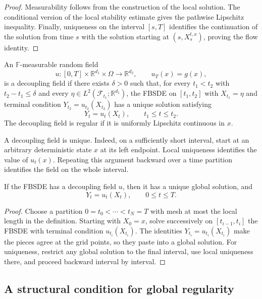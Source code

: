 \begin{proof}
Measurability follows from the construction of the local solution.  The
conditional version of the local stability estimate gives the pathwise
Lipschitz inequality.  Finally, uniqueness on the interval $[s,T]$
identifies the continuation of the solution from time $s$ with the
solution starting at $(s,X_s^{t,x})$, proving the flow identity.
\end{proof}

\begin{de}
An $\mathbb F$-measurable random field
\[
  u:[0,T]\times\mathbb R^{d_1}\times\Omega\longrightarrow\mathbb R^{d_2},
  \qquad u_T(x)=g(x),
\]
is a decoupling field if there exists $\delta>0$ such that, for every
$t_1<t_2$ with $t_2-t_1\le\delta$ and every
$\eta\in L^2(\mathcal F_{t_1};\mathbb R^{d_1})$, the FBSDE on
$[t_1,t_2]$ with $X_{t_1}=\eta$ and terminal condition
$Y_{t_2}=u_{t_2}(X_{t_2})$ has a unique solution satisfying
\[
  Y_t=u_t(X_t),
  \qquad t_1\le t\le t_2.
\]
The decoupling field is regular if it is uniformly Lipschitz continuous
in $x$.
\end{de}

\begin{remark}
A decoupling field is unique.  Indeed, on a sufficiently short interval,
start at an arbitrary deterministic state $x$ at its left endpoint.
Local uniqueness identifies the value of $u_t(x)$.  Repeating this
argument backward over a time partition identifies the field on the
whole interval.
\end{remark}

\begin{thm}
If the FBSDE has a decoupling field $u$, then it has a unique global
solution, and
\[
  Y_t=u_t(X_t),
  \qquad 0\le t\le T.
\]
\end{thm}

\begin{proof}
Choose a partition
$0=t_0<\cdots<t_N=T$ with mesh at most the local length in the definition.
Starting with $X_0=x$, solve successively on $[t_{i-1},t_i]$ the FBSDE
with terminal condition $u_{t_i}(X_{t_i})$.  The identities
$Y_{t_i}=u_{t_i}(X_{t_i})$ make the pieces agree at the grid points, so
they paste into a global solution.  For uniqueness, restrict any global
solution to the final interval, use local uniqueness there, and proceed
backward interval by interval.
\end{proof}

\subsection{A structural condition for global regularity}

